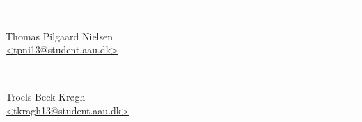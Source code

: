 \noindent
\begin{minipage}[b]{0.45\textwidth}
    \centering
    \rule{\textwidth}{0.5pt}\\
    Thomas Pilgaard Nielsen\\
    {\footnotesize \href{mailto:tpni13@student.aau.dk}{<tpni13@student.aau.dk>}}
\end{minipage}
\hfill
\begin{minipage}[b]{0.45\textwidth}
    \centering
    \rule{\textwidth}{0.5pt}\\
    Troels Beck Kr\o gh\\
    {\footnotesize \href{mailto:tkragh13@student.aau.dk}{<tkragh13@student.aau.dk>}}
\end{minipage}\\
